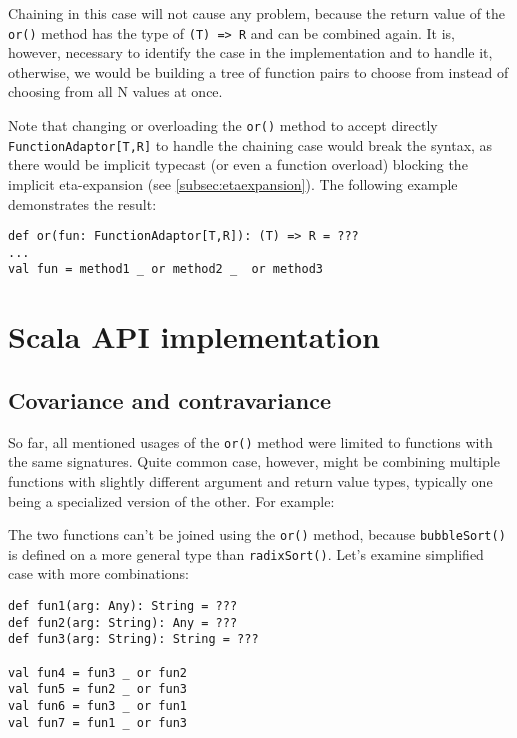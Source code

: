 Chaining in this case will not cause any problem, because the return value of the \lstinline|or()| method has the type of \lstinline|(T) => R| and can be combined again. It is, however, necessary to identify the case in the implementation and to handle it, otherwise, we would be building a tree of function pairs to choose from instead of choosing from all N values at once.

Note that changing or overloading the \lstinline|or()| method to accept directly \lstinline|FunctionAdaptor[T,R]| to handle the chaining case would break the syntax, as there would be implicit typecast (or even a function overload) blocking the implicit eta-expansion (see \ref{subsec:etaexpansion}). The following example demonstrates the result:

\lstset{style=Scala}
\begin{lstlisting}
def or(fun: FunctionAdaptor[T,R]): (T) => R = ???
...
val fun = method1 _ or method2 _  or method3
\end{lstlisting}


\section{Scala API implementation}



\subsection{Covariance and contravariance}

So far, all mentioned usages of the \lstinline|or()| method were limited to functions with the same signatures. Quite common case, however, might be combining multiple functions with slightly different argument and return value types, typically one being a specialized version of the other. For example:


The two functions can't be joined using the \lstinline|or()| method, because \lstinline|bubbleSort()| is defined on a more general type than \lstinline|radixSort()|. Let's examine simplified case with more combinations:

\lstset{style=Scala}
\begin{lstlisting}
def fun1(arg: Any): String = ???
def fun2(arg: String): Any = ???
def fun3(arg: String): String = ???

val fun4 = fun3 _ or fun2
val fun5 = fun2 _ or fun3
val fun6 = fun3 _ or fun1
val fun7 = fun1 _ or fun3
\end{lstlisting}


